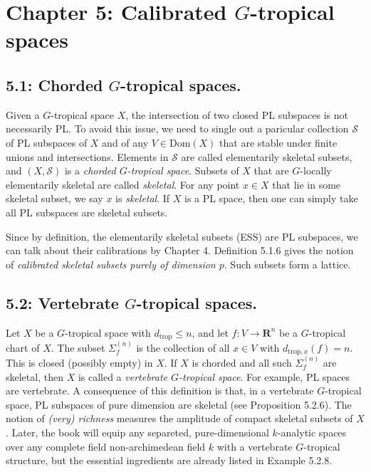 \documentclass[12pt,reqno]{amsart}
\theoremstyle{definition}
\theoremstyle{remark}
\theoremstyle{citedrem}
\theoremstyle{cited}
\theoremstyle{citeddef}
\theoremstyle{step}
\begin{document}
\section*{Chapter 5: Calibrated $G$-tropical spaces}
\subsection*{5.1: Chorded $G$-tropical spaces.} Given a $G$-tropical space $X$, the intersection of two closed PL subspaces is not necessarily PL. To avoid this issue, we need to single out a paricular collection $\mathcal{S}$ of PL subspaces of $X$ and of any $V \in \mathrm{Dom}(X)$ that are stable under finite unions and intersections. Elements in $\mathcal{S}$ are called elementarily skeletal subsets, and $(X, \mathcal{S})$ is a \emph{chorded $G$-tropical space}. Subsets of $X$ that are $G$-locally elementarily skeletal are called \emph{skeletal}. For any point $x \in X$ that lie in some skeletal subset, we say $x$ is \emph{skeletal}. If $X$ is a PL space, then one can simply take all PL subspaces are skeletal subsets. 

Since by definition, the elementarily skeletal subsets (ESS) are PL subspaces, we can talk about their calibrations by Chapter 4. Definition 5.1.6 gives the notion of \emph{calibrated skeletal subsets purely of dimension $p$}. Such subsets form a lattice. 

\subsection*{5.2: Vertebrate $G$-tropical spaces.} Let $X$ be a $G$-tropical space with $d_{\mathrm{trop}} \leq n$, and let $f \colon V \to \mathbf{R}^n$ be a $G$-tropical chart of $X$. The subset $\Sigma_f^{(n)}$ is the collection of all $x \in V$ with $d_{\mathrm{trop},x}(f) = n$. This is closed (possibly empty) in $X$. If $X$ is chorded and all such $\Sigma_f^{(n)}$ are skeletal, then $X$ is called a \emph{vertebrate $G$-tropical space}. For example, PL spaces are vertebrate. A consequence of this definition is that, in a vertebrate $G$-tropical space, PL subspaces of pure dimension are skeletal (see Proposition 5.2.6). The notion of \emph{(very) richness} measures the amplitude of compact skeletal subsets of $X$. Later, the book will equip any separeted, pure-dimensional $k$-analytic spaces over any complete field non-archimedean field $k$ with a vertebrate $G$-tropical structure, but the essential ingredients are already listed in Example 5.2.8. 
\end{document}
